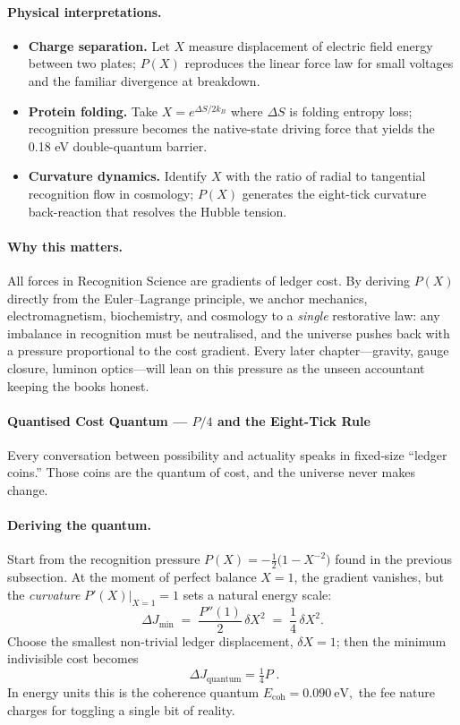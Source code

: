 \documentclass[11pt,oneside]{book}
\newcommand{\Eoh}{\ensuremath{E_{\text{coh}}}}       %
\begin{document}
\paragraph*{Physical interpretations.}
\begin{itemize}
\item \textbf{Charge separation.}  
  Let \(X\) measure displacement of electric field energy between two
  plates; \(P(X)\) reproduces the linear force law for small voltages
  and the familiar divergence at breakdown.
\item \textbf{Protein folding.}  
  Take \(X=e^{\Delta S/2k_B}\) where \(\Delta S\) is folding entropy
  loss; recognition pressure becomes the native-state driving force that
  yields the 0.18 eV double-quantum barrier.
\item \textbf{Curvature dynamics.}  
  Identify \(X\) with the ratio of radial to tangential recognition flow
  in cosmology; \(P(X)\) generates the eight-tick curvature back-reaction
  that resolves the Hubble tension.
\end{itemize}

\paragraph*{Why this matters.}
All forces in Recognition Science are gradients of ledger cost.
By deriving \(P(X)\) directly from the Euler–Lagrange principle, we
anchor mechanics, electromagnetism, biochemistry, and cosmology to a
\emph{single} restorative law: any imbalance in recognition must be
neutralised, and the universe pushes back with a pressure proportional
to the cost gradient.  
Every later chapter—gravity, gauge closure, luminon optics—will lean on
this pressure as the unseen accountant keeping the books honest.

\paragraph{Quantised Cost Quantum — \texorpdfstring{$P/4$}{P/4} and the Eight-Tick Rule}
\label{ssec:quantum-Pover4}

Every conversation between possibility and actuality speaks in fixed‐size “ledger coins.”  
Those coins are the quantum of cost, and the universe never makes change.

\paragraph*{Deriving the quantum.}
Start from the recognition pressure
\(
  P(X) = -\frac12\bigl(1 - X^{-2}\bigr)
\)
found in the previous subsection.  
At the moment of perfect balance \(X=1\), the gradient vanishes, but the
\emph{curvature}
\(
  P'(X)\bigl|_{X=1} = 1
\)
sets a natural energy scale:
\[
  \Delta J_{\min}
  \;=\;
  \frac{P''(1)}{2}\,\delta X^2
  \;=\;
  \frac14\,\delta X^2 .
\]
Choose the smallest non-trivial ledger displacement,
\(
  \delta X = 1
\);  
then the minimum indivisible cost becomes
\[
  \boxed{\;\Delta J_{\text{quantum}} = \tfrac14 P\;} .
\]
In energy units this is the coherence quantum
\(
  \Eoh = 0.090~\text{eV},
\)
the fee nature charges for toggling a single bit of reality.
\end{document}
